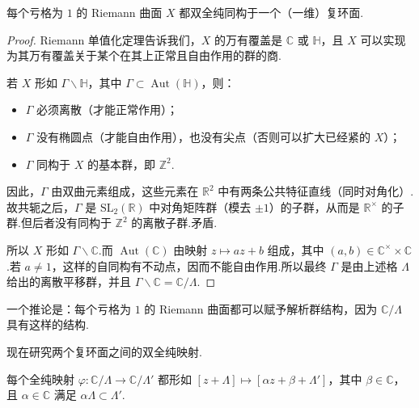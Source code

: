\begin{proposition*}

每个亏格为 $1$ 的 Riemann 曲面 $X$ 都双全纯同构于一个（一维）复环面.

\end{proposition*}

\begin{proof}

Riemann 单值化定理告诉我们，$X$ 的万有覆盖是 $\mathbb C$ 或 $\mathbb H$，且 $X$ 可以实现为其万有覆盖关于某个在其上正常且自由作用的群的商.



若 $X$ 形如 $\Gamma\backslash\mathbb H$，其中 $\Gamma\subset\operatorname{Aut}(\mathbb H)$，则：

\begin{itemize}

\item $\Gamma$ 必须离散（才能正常作用）；

\item $\Gamma$ 没有椭圆点（才能自由作用），也没有尖点（否则可以扩大已经紧的 $X$）；

\item $\Gamma$ 同构于 $X$ 的基本群，即 $\mathbb Z^2$.

\end{itemize}

因此，$\Gamma$ 由双曲元素组成，这些元素在 $\mathbb R^2$ 中有两条公共特征直线（同时对角化）.故共轭之后，$\Gamma$ 是 $\mathrm{SL}_2(\mathbb R)$ 中对角矩阵群（模去 $\pm1$）的子群，从而是 $\mathbb R^\times$ 的子群.但后者没有同构于 $\mathbb Z^2$ 的离散子群.矛盾.



所以 $X$ 形如 $\Gamma\backslash\mathbb C$.而 $\operatorname{Aut}(\mathbb C)$ 由映射 $z\mapsto az+b$ 组成，其中 $(a,b)\in\mathbb C^\times\times\mathbb C$.若 $a\ne1$，这样的自同构有不动点，因而不能自由作用.所以最终 $\Gamma$ 是由上述格 $\Lambda$ 给出的离散平移群，并且 $\Gamma\backslash\mathbb C=\mathbb C/\Lambda$.

\end{proof}

\begin{remark*}

一个推论是：每个亏格为 $1$ 的 Riemann 曲面都可以赋予解析群结构，因为 $\mathbb C/\Lambda$ 具有这样的结构.

\end{remark*}

现在研究两个复环面之间的双全纯映射.

\begin{proposition*}

每个全纯映射 $\varphi:\mathbb C/\Lambda\longrightarrow\mathbb C/\Lambda'$ 都形如 $[z+\Lambda]\mapsto[\alpha z+\beta+\Lambda']$，其中 $\beta\in\mathbb C$，且 $\alpha\in\mathbb C$ 满足 $\alpha\Lambda\subset\Lambda'$.

\end{proposition*}

